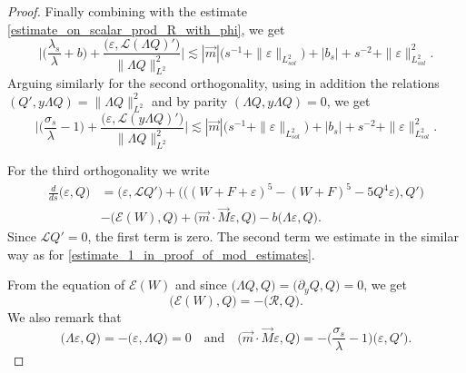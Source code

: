 \documentclass[16pt,english, oneside,reqno]{smfart}
\newcommand{\vare}{{\varepsilon}}
\begin{document}
\begin{proof}
    Finally combining with the estimate \eqref{estimate_on_scalar_prod_R_with_phi}, we get
    \begin{equation}\label{estimate_on_first_component_of_m_in_proof_of_mod_estimates}
        \Bigg\lvert \Big( \frac{\lambda_s}{\lambda} + b\Big) + \frac{\big( \vare,\mathcal{L}(\Lambda Q)' \big)}{\|\Lambda Q\|^2_{L^2}}\Bigg\rvert \lesssim |\vec{m}|\big( s^{-1} + \|\vare\|_{L^2_{sol}} \big) + |b_s| + s^{-2} + \|\vare\|^2_{L^2_{sol}}.
    \end{equation}
     Arguing similarly for the second orthogonality, using in addition the relations $(Q', y \Lambda Q) = \|\Lambda Q\|^2_{L^2}$ and by parity $(\Lambda Q, y \Lambda Q) =0 $, we get
    \begin{equation}\label{estimate_on_second_component_of_m_in_proof_of_mod_estimates}
        \Bigg\lvert \Big( \frac{\sigma_s}{\lambda} -1\Big) + \frac{\big( \vare,\mathcal{L}(y\Lambda Q)' \big)}{\|\Lambda Q\|^2_{L^2}}\Bigg\rvert \lesssim |\vec{m}|\big( s^{-1} + \|\vare\|_{L^2_{sol}} \big) + |b_s| + s^{-2} + \|\vare\|^2_{L^2_{sol}}.
    \end{equation}

    For the third orthogonality we write
    \begin{equation}
    \begin{split}
        \frac{d}{ds}\big( \vare, Q \big)
        & = \big( \vare, \mathcal{L}Q'\big) + \big( \big( (W+F+\vare)^5- (W+F)^5 - 5Q^4\vare \big), Q' \big)\\
        &- \big( \mathcal{E}(W), Q \big) + \big( \vec{m}\cdot\vec{M} \vare, Q \big) - b\big(\Lambda \vare, Q \big).
    \end{split}
    \end{equation}
    Since $\mathcal{L}Q' = 0$, the first term is zero. The second term we estimate in the similar way as for \eqref{estimate_1_in_proof_of_mod_estimates}.
    
    From the equation of $\mathcal{E}(W)$ and since $\big( \Lambda Q, Q \big) = \big( \partial_y Q,Q\big) =0$, we get 
    \begin{equation}
        \big(\mathcal{E}(W),Q \big) = -\big( \mathcal{R}, Q \big).
    \end{equation}
    We also remark that 
    \begin{equation}
        \big( \Lambda \vare, Q\big) = -\big( \vare, \Lambda Q \big) =0 \quad\text{and}\quad \big( \vec{m}\cdot\vec{M}\vare, Q \big) = -\Big( \frac{\sigma_s}{\lambda}-1\Big)\big( \vare, Q' \big).
    \end{equation}


\end{proof}
\end{document}
